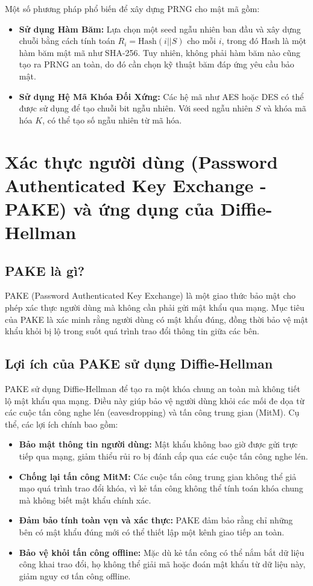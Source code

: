 \documentclass[a4paper,12pt]{article}
\begin{document}
Một số phương pháp phổ biến để xây dựng PRNG cho mật mã gồm:
\begin{itemize}
    \item \textbf{Sử dụng Hàm Băm:} Lựa chọn một seed ngẫu nhiên ban đầu và xây dựng chuỗi bằng cách tính toán \( R_i = \text{Hash}(i||S) \) cho mỗi \( i \), trong đó Hash là một hàm băm mật mã như SHA-256. Tuy nhiên, không phải hàm băm nào cũng tạo ra PRNG an toàn, do đó cần chọn kỹ thuật băm đáp ứng yêu cầu bảo mật.
    \item \textbf{Sử dụng Hệ Mã Khóa Đối Xứng:} Các hệ mã như AES hoặc DES có thể được sử dụng để tạo chuỗi bit ngẫu nhiên. Với seed ngẫu nhiên \( S \) và khóa mã hóa \( K \), có thể tạo số ngẫu nhiên từ mã hóa.
\end{itemize}

\section{Xác thực người dùng (Password Authenticated Key Exchange - PAKE) và ứng dụng của Diffie-Hellman}

\subsection{PAKE là gì?}
PAKE (Password Authenticated Key Exchange) là một giao thức bảo mật cho phép xác thực người dùng mà không cần phải gửi mật khẩu qua mạng. Mục tiêu của PAKE là xác minh rằng người dùng có mật khẩu đúng, đồng thời bảo vệ mật khẩu khỏi bị lộ trong suốt quá trình trao đổi thông tin giữa các bên.

\subsection{Lợi ích của PAKE sử dụng Diffie-Hellman}
PAKE sử dụng Diffie-Hellman để tạo ra một khóa chung an toàn mà không tiết lộ mật khẩu qua mạng. Điều này giúp bảo vệ người dùng khỏi các mối đe dọa từ các cuộc tấn công nghe lén (eavesdropping) và tấn công trung gian (MitM). Cụ thể, các lợi ích chính bao gồm:
\begin{itemize}
    \item \textbf{Bảo mật thông tin người dùng:} Mật khẩu không bao giờ được gửi trực tiếp qua mạng, giảm thiểu rủi ro bị đánh cắp qua các cuộc tấn công nghe lén.
    \item \textbf{Chống lại tấn công MitM:} Các cuộc tấn công trung gian không thể giả mạo quá trình trao đổi khóa, vì kẻ tấn công không thể tính toán khóa chung mà không biết mật khẩu chính xác.
    \item \textbf{Đảm bảo tính toàn vẹn và xác thực:} PAKE đảm bảo rằng chỉ những bên có mật khẩu đúng mới có thể thiết lập một kênh giao tiếp an toàn.
    \item \textbf{Bảo vệ khỏi tấn công offline:} Mặc dù kẻ tấn công có thể nắm bắt dữ liệu công khai trao đổi, họ không thể giải mã hoặc đoán mật khẩu từ dữ liệu này, giảm nguy cơ tấn công offline.
\end{itemize}
\end{document}
